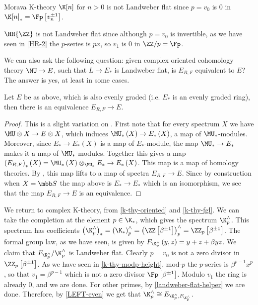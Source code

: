 \begin{example}
	Morava K-theory $\K[n]$ for $n > 0$ is not Landweber flat since $p = v_0$ is $0$ in $\K[n]_* = \Fp\left[v_n^{\pm 1}\right]$.
\end{example}

\begin{example}
	$\HH{\ZZ}$ is not Landweber flat since although $p = v_0$ is invertible, as we have seen in \ref{HR-2} the $p$-series is $px$, so $v_1$ is $0$ in $\ZZ/p = \Fp$.
\end{example}

We can also ask the following question: given complex oriented cohomology theory $\MU \to E$, such that $L \to E_*$ is Landweber flat, is $E_{R,F}$ equivalent to $E$?
The answer is yes, at least in some cases.

\begin{theorem}\label{LEFT-even}
	Let $E$ be as above, which is also evenly graded (i.e. $E_*$ is an evenly graded ring), then there is an equivalence $E_{R,F} \to E$.
\end{theorem}

\begin{proof}
	This is a slight variation on \cite[18, proposition 11]{Lur}.
	First note that for every spectrum $X$ we have $\MU \otimes X \to E \otimes X$, which induces $\MU_*\left(X\right) \to E_*\left(X\right)$, a map of $\MU_*$-modules.
	Moreover, since $E_* \to E_*\left(X\right)$ is a map of $E_*$-module, the map $\MU_* \to E_*$ makes it a map of $\MU_*$-modules.
	Together this gives a map $\left(E_{R,F}\right)_*\left(X\right) = \MU_*\left(X\right) \otimes_{\MU_*} E_* \to E_*\left(X\right)$.
	This map is a map of homology theories. 
	By \cite[17, theorem 6]{Lur} , this map lifts to a map of spectra $E_{R,F} \to E$.
	Since by construction when $X = \SS$ the map above is $E_* \to E_*$ which is an isomorphism, we see that the map $E_{R,F} \to E$ is an equivalence.
\end{proof}

\begin{example}\label{k-thy-comp-left}
	We return to complex K-theory, from \ref{k-thy-oriented} and \ref{k-thy-fgl}.
	We can take the completion at the element $p \in \K_*$, which gives the spectrum $\K_p^\wedge$.
	This spectrum has coefficients
	$
	\left(\K_p^\wedge\right)_*
	= \left(\K_*\right)_p^\wedge
	= \left(\ZZ\left[\beta^{\pm 1}\right]\right)_p^\wedge
	= \ZZ_p\left[\beta^{\pm 1}\right]
	$.
	The formal group law, as we have seen, is given by $F_{\K_p^\wedge}\left(y,z\right) = y + z + \beta y z$.
	We claim that $F_{\K_p^\wedge}/\K_p^\wedge$ is Landweber flat.
	Clearly $p = v_0$ is not a zero divisor in $\ZZ_p\left[\beta^{\pm 1}\right]$.
	As we have seen in \ref{k-thy-modp-height}, mod-$p$ the $p$-series is $\beta^{p-1} x^p$, so that $v_1 = \beta^{p-1}$ which is not a zero divisor $\Fp\left[\beta^{\pm 1}\right]$.
	Modulo $v_1$ the ring is already $0$, and we are done.
	For other primes, by \ref{landweber-flat-helper} we are done.
	Therefore, by \ref{LEFT-even} we get that $\K_p^\wedge \cong E_{\K_p^\wedge, F_{\K_p^\wedge}}$.
\end{example}



